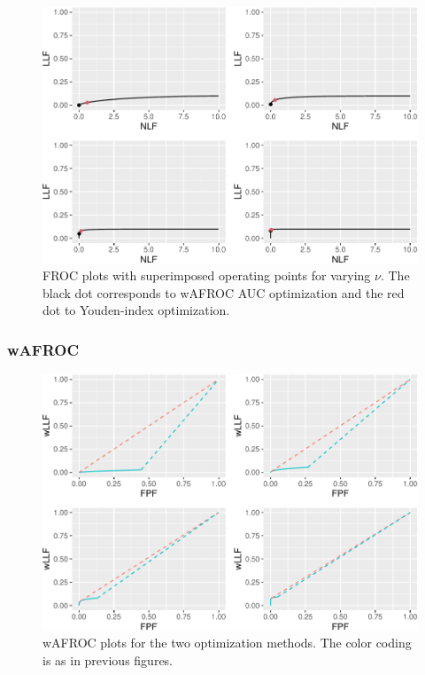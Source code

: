 \documentclass[
]{book}
\begin{document}
\begin{figure}
\centering
\includegraphics{22-optim-op-point_files/figure-latex/optim-op-point-low-performance-vary-mu-vary-all-1.pdf}
\caption{\label{fig:optim-op-point-low-performance-vary-mu-vary-all}FROC plots with superimposed operating points for varying \(\nu\). The black dot corresponds to wAFROC AUC optimization and the red dot to Youden-index optimization.}
\end{figure}

\hypertarget{wafroc-6}{%
\subsubsection{wAFROC}\label{wafroc-6}}

\begin{figure}
\centering
\includegraphics{22-optim-op-point_files/figure-latex/optim-op-point-low-performance-vary-mu-vary-all-wafroc-1.pdf}
\caption{\label{fig:optim-op-point-low-performance-vary-mu-vary-all-wafroc}wAFROC plots for the two optimization methods. The color coding is as in previous figures.}
\end{figure}
\end{document}
